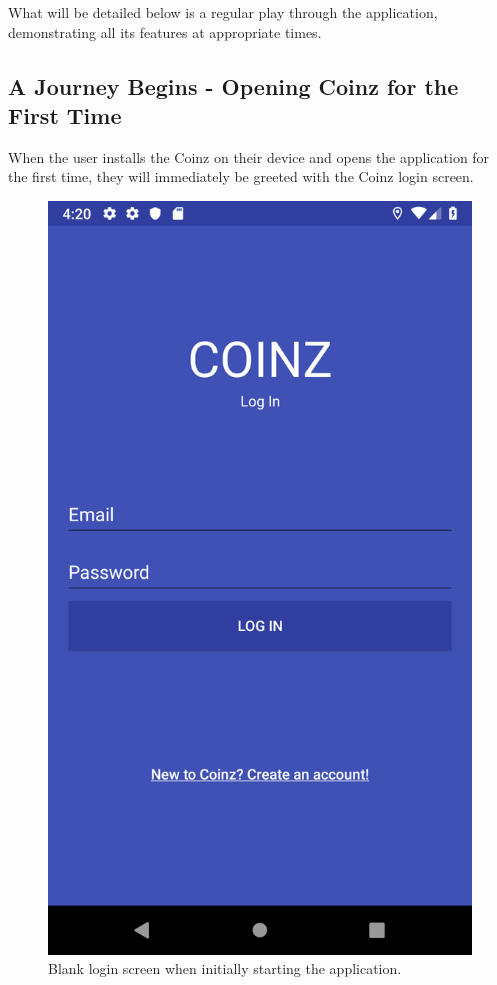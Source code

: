 \documentclass[11pt,a4paper,notitlepage]{article}
\begin{document}
    What will be detailed below is a regular play through the application, demonstrating all its features at appropriate times.

\subsection{A Journey Begins - Opening Coinz for the First Time}

    When the user installs the Coinz on their device and opens the application for the first time, they will immediately be greeted with the Coinz login screen.

\begin{figure}[H]
    \centering
    \includegraphics[scale=0.25]{screenshots/log-in/log-in-screen.png}
    \caption{Blank login screen when initially starting the application.}
\end{figure}
\end{document}
